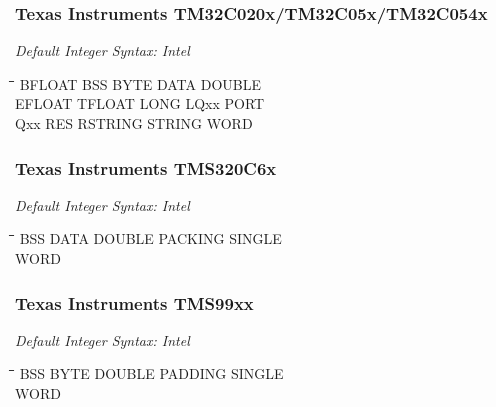 \subsubsection{Texas Instruments TM32C020x/TM32C05x/TM32C054x}

{\em Default Integer Syntax: Intel}

{\tt\begin{tabbing}
\hspace{3cm}\=\hspace{3cm}\=\hspace{3cm}\=\hspace{3cm}\=\kill
BFLOAT     \> BSS         \> BYTE        \> DATA        \> DOUBLE \\
EFLOAT     \> TFLOAT      \> LONG        \> LQxx        \> PORT \\
Qxx        \> RES         \> RSTRING     \> STRING      \> WORD \\
\end{tabbing}}

\subsubsection{Texas Instruments TMS320C6x}

{\em Default Integer Syntax: Intel}

{\tt\begin{tabbing}
\hspace{3cm}\=\hspace{3cm}\=\hspace{3cm}\=\hspace{3cm}\=\kill
BSS         \> DATA        \> DOUBLE     \> PACKING     \> SINGLE \\
WORD \\
\end{tabbing}}

\subsubsection{Texas Instruments TMS99xx}

{\em Default Integer Syntax: Intel}

{\tt\begin{tabbing}
\hspace{3cm}\=\hspace{3cm}\=\hspace{3cm}\=\hspace{3cm}\=\kill
BSS        \> BYTE        \> DOUBLE      \> PADDING     \> SINGLE \\
WORD \\
\end{tabbing}}

